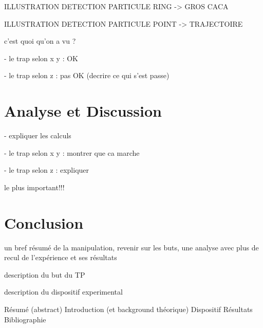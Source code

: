 \documentclass[a4paper,12pt,twoside]{article}	%
\begin{document}
ILLUSTRATION DETECTION PARTICULE RING -> GROS CACA

ILLUSTRATION DETECTION PARTICULE POINT -> TRAJECTOIRE

c'est quoi qu'on a vu ?

- le trap selon x y : OK

- le trap selon z : pas OK (decrire ce qui s'est passe)

\section{Analyse et Discussion}

- expliquer les calculs

- le trap selon x y : montrer que ca marche

- le trap selon z : expliquer

le plus important!!!

\section{Conclusion}

un bref résumé de la manipulation, revenir sur les buts, une analyse avec plus de recul de l'expérience et ses résultats

description du but du TP

description du dispositif experimental

Résumé (abstract)
Introduction (et background théorique)
Dispositif
Résultats
Bibliographie
\end{document}

